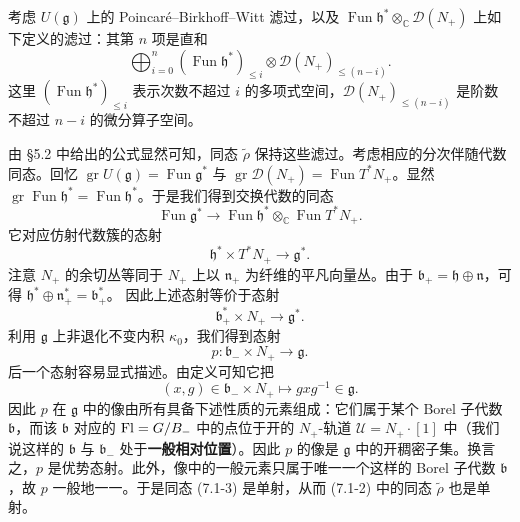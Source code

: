 考虑 $U(\mathfrak{g})$ 上的 Poincaré--Birkhoff--Witt 滤过，以及 $\operatorname{Fun}\mathfrak{h}^*\otimes_{\mathbb{C}}\mathcal{D}(N_+)$ 上如下定义的滤过：其第 $n$ 项是直和
\[
    \bigoplus_{i=0}^{n}(\operatorname{Fun}\mathfrak{h}^*)_{\le i}\otimes\mathcal{D}(N_+)_{\le(n-i)}.
\]
这里 $(\operatorname{Fun}\mathfrak{h}^*)_{\le i}$ 表示次数不超过 $i$ 的多项式空间，$\mathcal{D}(N_+)_{\le(n-i)}$ 是阶数不超过 $n-i$ 的微分算子空间。

由 §5.2 中给出的公式显然可知，同态 $\widetilde{\rho}$ 保持这些滤过。考虑相应的分次伴随代数同态。回忆 $\operatorname{gr}U(\mathfrak{g})=\operatorname{Fun}\mathfrak{g}^*$ 与 $\operatorname{gr}\mathcal{D}(N_+)=\operatorname{Fun}T^*N_+$。显然 $\operatorname{gr}\operatorname{Fun}\mathfrak{h}^*=\operatorname{Fun}\mathfrak{h}^*$。于是我们得到交换代数的同态
\begin{equation}
    \operatorname{Fun}\mathfrak{g}^*\longrightarrow\operatorname{Fun}\mathfrak{h}^*\otimes_{\mathbb{C}}\operatorname{Fun}T^*N_+.
    \tag{7.1-3}
\end{equation}
它对应仿射代数簇的态射
\[
    \mathfrak{h}^*\times T^*N_+\longrightarrow\mathfrak{g}^*.
\]
注意 $N_+$ 的余切丛等同于 $N_+$ 上以 $\mathfrak{n}_+$ 为纤维的平凡向量丛。由于 $\mathfrak{b}_+=\mathfrak{h}\oplus\mathfrak{n}$，可得 $\mathfrak{h}^*\oplus\mathfrak{n}_+^*=\mathfrak{b}_+^*$。
因此上述态射等价于态射
\[
    \mathfrak{b}_+^*\times N_+\longrightarrow\mathfrak{g}^*.
\]
利用 $\mathfrak{g}$ 上非退化不变内积 $\kappa_0$，我们得到态射
\begin{equation}
    p:\mathfrak{b}_-\times N_+\longrightarrow\mathfrak{g}.
    \tag{7.1-4}
\end{equation}
后一个态射容易显式描述。由定义可知它把
\[
    (x,g)\in\mathfrak{b}_-\times N_+\longmapsto gxg^{-1}\in\mathfrak{g}.
\]
因此 $p$ 在 $\mathfrak{g}$ 中的像由所有具备下述性质的元素组成：它们属于某个 Borel 子代数 $\mathfrak{b}$，而该 $\mathfrak{b}$ 对应的 $\operatorname{Fl}=G/B_-$ 中的点位于开的 $N_+$-轨道 $\mathcal{U}=N_+\cdot[1]$ 中（我们说这样的 $\mathfrak{b}$ 与 $\mathfrak{b}_-$ 处于\textbf{一般相对位置}）。因此 $p$ 的像是 $\mathfrak{g}$ 中的开稠密子集。换言之，$p$ 是优势态射。此外，像中的一般元素只属于唯一一个这样的 Borel 子代数 $\mathfrak{b}$，故 $p$ 一般地一一。于是同态 (7.1-3) 是单射，从而 (7.1-2) 中的同态 $\widetilde{\rho}$ 也是单射。
